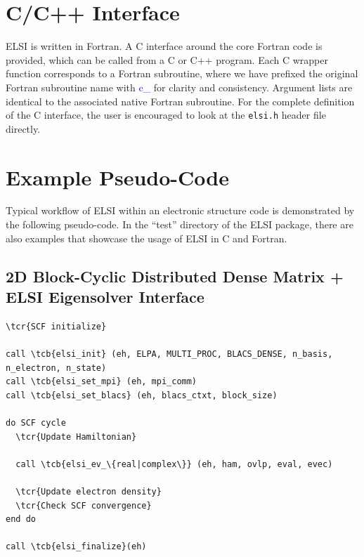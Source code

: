 \documentclass{report}
\newcommand{\tcb}[1]{\textcolor{blue}{#1}}
\newcommand{\tcr}[1]{\textcolor{red}{#1}}
\begin{document}
\section{C/C++ Interface}
\label{sec:c}
ELSI is written in Fortran. A C interface around the core Fortran code is provided, which can be called from a C or C++ program. Each C wrapper function corresponds to a Fortran subroutine, where we have prefixed the original Fortran subroutine name with \tcb{c\_} for clarity and consistency. Argument lists are identical to the associated native Fortran subroutine. For the complete definition of the C interface, the user is encouraged to look at the \texttt{elsi.h} header file directly.

\section{Example Pseudo-Code}
\label{sec:example}
Typical workflow of ELSI within an electronic structure code is demonstrated by the following pseudo-code. In the ``test'' directory of the ELSI package, there are also examples that showcase the usage of ELSI in C and Fortran.

\subsection*{2D Block-Cyclic Distributed Dense Matrix + ELSI Eigensolver Interface}
\begin{tcolorbox}
\begin{Verbatim}[commandchars=\\\{\}]
\tcr{SCF initialize}

call \tcb{elsi_init} (eh, ELPA, MULTI_PROC, BLACS_DENSE, n_basis, n_electron, n_state)
call \tcb{elsi_set_mpi} (eh, mpi_comm)
call \tcb{elsi_set_blacs} (eh, blacs_ctxt, block_size)

do SCF cycle
  \tcr{Update Hamiltonian}

  call \tcb{elsi_ev_\{real|complex\}} (eh, ham, ovlp, eval, evec)

  \tcr{Update electron density}
  \tcr{Check SCF convergence}
end do

call \tcb{elsi_finalize}(eh)
\end{Verbatim}
\end{tcolorbox}
\end{document}
